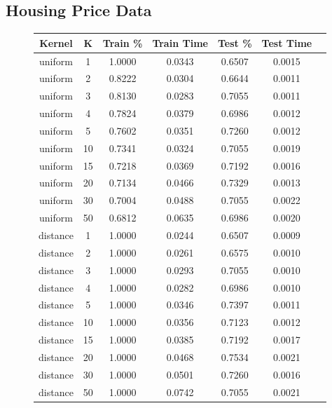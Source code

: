 \documentclass[h]{article}
\begin{document}
\subsection*{Housing Price Data}

\begin{figure}[H]
\begin{tabular}{ | c | c  | c | c | c | c | c |} 
\hline

\textbf{Kernel} & \textbf{K} & \textbf{Train \%} & \textbf{Train Time} & \textbf{Test \%} & \textbf{Test Time}   \\ \hline
uniform & 1 & 1.0000 & 0.0343 & 0.6507 & 0.0015 \\ \hline
uniform & 2 & 0.8222 & 0.0304 & 0.6644 & 0.0011 \\ \hline
uniform & 3 & 0.8130 & 0.0283 & 0.7055 & 0.0011 \\ \hline
uniform & 4 & 0.7824 & 0.0379 & 0.6986 & 0.0012 \\ \hline
uniform & 5 & 0.7602 & 0.0351 & 0.7260 & 0.0012 \\ \hline
uniform & 10 & 0.7341 & 0.0324 & 0.7055 & 0.0019 \\ \hline
uniform & 15 & 0.7218 & 0.0369 & 0.7192 & 0.0016 \\ \hline
uniform & 20 & 0.7134 & 0.0466 & 0.7329 & 0.0013 \\ \hline
uniform & 30 & 0.7004 & 0.0488 & 0.7055 & 0.0022 \\ \hline
uniform & 50 & 0.6812 & 0.0635 & 0.6986 & 0.0020 \\ \hline
distance & 1 & 1.0000 & 0.0244 & 0.6507 & 0.0009 \\ \hline
distance & 2 & 1.0000 & 0.0261 & 0.6575 & 0.0010 \\ \hline
distance & 3 & 1.0000 & 0.0293 & 0.7055 & 0.0010 \\ \hline
distance & 4 & 1.0000 & 0.0282 & 0.6986 & 0.0010 \\ \hline
distance & 5 & 1.0000 & 0.0346 & 0.7397 & 0.0011 \\ \hline
distance & 10 & 1.0000 & 0.0356 & 0.7123 & 0.0012 \\ \hline
distance & 15 & 1.0000 & 0.0385 & 0.7192 & 0.0017 \\ \hline
distance & 20 & 1.0000 & 0.0468 & 0.7534 & 0.0021 \\ \hline
distance & 30 & 1.0000 & 0.0501 & 0.7260 & 0.0016 \\ \hline
distance & 50 & 1.0000 & 0.0742 & 0.7055 & 0.0021 \\ \hline


\end{tabular}
\end{figure}
\end{document}
